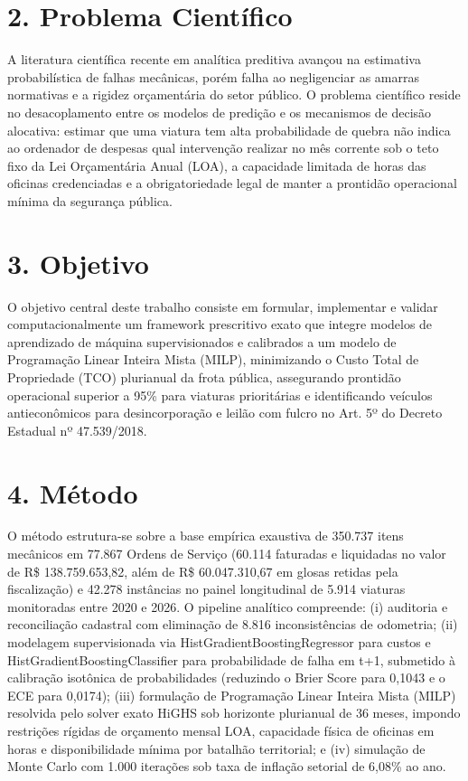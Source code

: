 \documentclass[10pt,a4paper,journal]{article}
\begin{document}
\section{2. Problema Científico}
A literatura científica recente em analítica preditiva avançou na estimativa probabilística de falhas mecânicas, porém falha ao negligenciar as amarras normativas e a rigidez orçamentária do setor público. O problema científico reside no desacoplamento entre os modelos de predição e os mecanismos de decisão alocativa: estimar que uma viatura tem alta probabilidade de quebra não indica ao ordenador de despesas qual intervenção realizar no mês corrente sob o teto fixo da Lei Orçamentária Anual (LOA), a capacidade limitada de horas das oficinas credenciadas e a obrigatoriedade legal de manter a prontidão operacional mínima da segurança pública.

\section{3. Objetivo}
O objetivo central deste trabalho consiste em formular, implementar e validar computacionalmente um framework prescritivo exato que integre modelos de aprendizado de máquina supervisionados e calibrados a um modelo de Programação Linear Inteira Mista (MILP), minimizando o Custo Total de Propriedade (TCO) plurianual da frota pública, assegurando prontidão operacional superior a 95\% para viaturas prioritárias e identificando veículos antieconômicos para desincorporação e leilão com fulcro no Art. 5º do Decreto Estadual nº 47.539/2018.

\section{4. Método}
O método estrutura-se sobre a base empírica exaustiva de 350.737 itens mecânicos em 77.867 Ordens de Serviço (60.114 faturadas e liquidadas no valor de R\$ 138.759.653,82, além de R\$ 60.047.310,67 em glosas retidas pela fiscalização) e 42.278 instâncias no painel longitudinal de 5.914 viaturas monitoradas entre 2020 e 2026. O pipeline analítico compreende: (i) auditoria e reconciliação cadastral com eliminação de 8.816 inconsistências de odometria; (ii) modelagem supervisionada via HistGradientBoostingRegressor para custos e HistGradientBoostingClassifier para probabilidade de falha em t+1, submetido à calibração isotônica de probabilidades (reduzindo o Brier Score para 0,1043 e o ECE para 0,0174); (iii) formulação de Programação Linear Inteira Mista (MILP) resolvida pelo solver exato HiGHS sob horizonte plurianual de 36 meses, impondo restrições rígidas de orçamento mensal LOA, capacidade física de oficinas em horas e disponibilidade mínima por batalhão territorial; e (iv) simulação de Monte Carlo com 1.000 iterações sob taxa de inflação setorial de 6,08\% ao ano.
\end{document}
